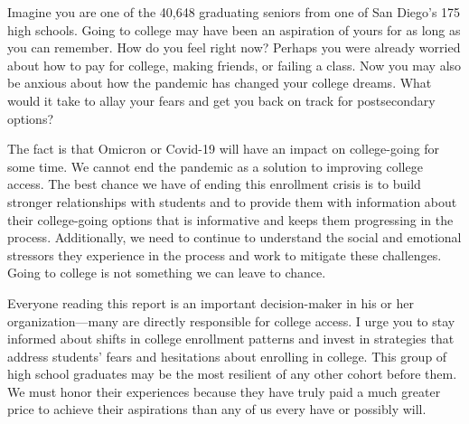 \documentclass[
  11pt,
]{article}
\begin{document}
\newpage{}


Imagine you are one of the 40,648 graduating seniors from one of San
Diego's 175 high schools. Going to college may have been an aspiration
of yours for as long as you can remember. How do you feel right now?
Perhaps you were already worried about how to pay for college, making
friends, or failing a class. Now you may also be anxious about how the
pandemic has changed your college dreams. What would it take to allay
your fears and get you back on track for postsecondary options?

The fact is that Omicron or Covid-19 will have an impact on
college-going for some time. We cannot end the pandemic as a solution to
improving college access. The best chance we have of ending this
enrollment crisis is to build stronger relationships with students and
to provide them with information about their college-going options that
is informative and keeps them progressing in the process. Additionally,
we need to continue to understand the social and emotional stressors
they experience in the process and work to mitigate these challenges.
Going to college is not something we can leave to chance.

Everyone reading this report is an important decision-maker in his or
her organization---many are directly responsible for college access. I
urge you to stay informed about shifts in college enrollment patterns
and invest in strategies that address students' fears and hesitations
about enrolling in college. This group of high school graduates may be
the most resilient of any other cohort before them. We must honor their
experiences because they have truly paid a much greater price to achieve
their aspirations than any of us every have or possibly will.

\end{document}
